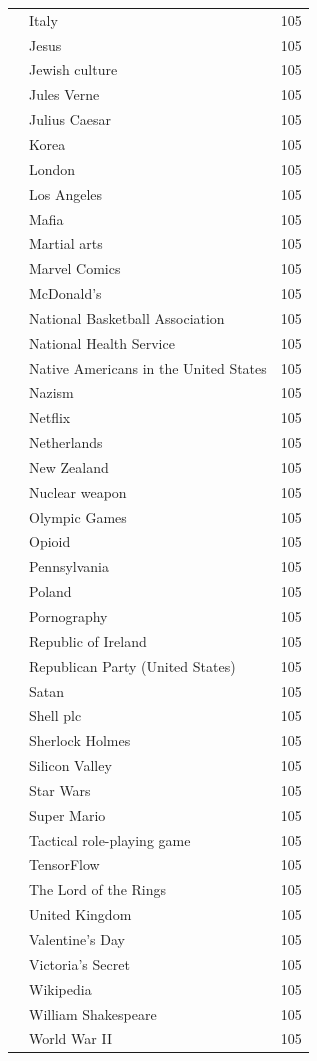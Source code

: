 \documentclass{article}
\begin{document}
{\begin{longtable}{p{}p{}r}
 & Italy & 105 \\
 & Jesus & 105 \\
 & Jewish culture & 105 \\
 & Jules Verne & 105 \\
 & Julius Caesar & 105 \\
 & Korea & 105 \\
 & London & 105 \\
 & Los Angeles & 105 \\
 & Mafia & 105 \\
 & Martial arts & 105 \\
 & Marvel Comics & 105 \\
 & McDonald's & 105 \\
 & National Basketball Association & 105 \\
 & National Health Service & 105 \\
 & Native Americans in the United States & 105 \\
 & Nazism & 105 \\
 & Netflix & 105 \\
 & Netherlands & 105 \\
 & New Zealand & 105 \\
 & Nuclear weapon & 105 \\
 & Olympic Games & 105 \\
 & Opioid & 105 \\
 & Pennsylvania & 105 \\
 & Poland & 105 \\
 & Pornography & 105 \\
 & Republic of Ireland & 105 \\
 & Republican Party (United States) & 105 \\
 & Satan & 105 \\
 & Shell plc & 105 \\
 & Sherlock Holmes & 105 \\
 & Silicon Valley & 105 \\
 & Star Wars & 105 \\
 & Super Mario & 105 \\
 & Tactical role-playing game & 105 \\
 & TensorFlow & 105 \\
 & The Lord of the Rings & 105 \\
 & United Kingdom & 105 \\
 & Valentine's Day & 105 \\
 & Victoria's Secret & 105 \\
 & Wikipedia & 105 \\
 & William Shakespeare & 105 \\
 & World War II & 105 \\
\end{longtable}
}
\end{document}
